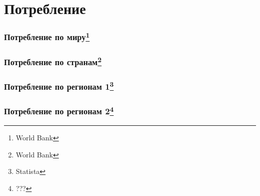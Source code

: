 \section{Потребление}

\begin{frame}
    \frametitle{Потребление по миру\footnote{World Bank}}
    \begin{center}
        
    \end{center}
\end{frame}

\begin{frame}
    \frametitle{Потребление по странам\footnote{World Bank}}
    \begin{center}
        
    \end{center}
\end{frame}

\begin{frame}
    \frametitle{Потребление по регионам 1\footnote{Statista}}
    \begin{center}
        
    \end{center}
\end{frame}

\begin{frame}
    \frametitle{Потребление по регионам 2\footnote{???}}
    \begin{center}
        
    \end{center}
\end{frame}